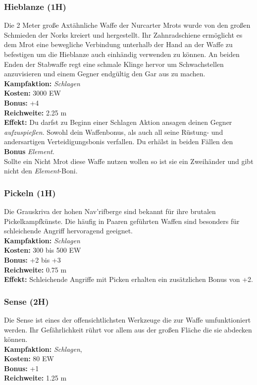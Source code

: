 \subsubsection*{Hieblanze (1H)} \label{ar:hieblanze}
Die 2 Meter große Axtähnliche Waffe der Nurcarter Mrots wurde von den großen Schmieden der Norks kreiert und hergestellt. Ihr Zahnradschiene ermöglicht es dem Mrot eine bewegliche Verbindung unterhalb der Hand an der Waffe zu befestigen um die Hieblanze auch einhändig verwenden zu können. An beiden Enden der Stabwaffe regt eine schmale Klinge hervor um Schwachstellen anzuvisieren und einem Gegner endgültig den Gar aus zu machen. \\
\textbf{Kampfaktion:} \textit{Schlagen}\\
\textbf{Kosten:} 3000 EW\\
\textbf{Bonus:} +4\\
\textbf{Reichweite:} 2.25 m \\
\textbf{Effekt:} Du darfst zu Beginn einer Schlagen Aktion ansagen deinen Gegner \textit{aufzuspießen}. Sowohl dein Waffenbonus, als auch all seine Rüstung- und andersartigen Verteidigungsbonis verfallen. Du erhälst in beiden Fällen den \textbf{Bonus} \textit{Element}.\\
Sollte ein Nicht Mrot diese Waffe nutzen wollen so ist sie ein Zweihänder und gibt nicht den \textit{Element}-Boni.

\subsubsection*{Pickeln (1H)}
Die Grauskriva der hohen Nav'rifberge sind bekannt für ihre brutalen Pickelkampfkünste. Die häufig in Paaren geführten Waffen sind besonders für schleichende Angriff hervoragend geeignet.\\
\textbf{Kampfaktion:} \textit{Schlagen}\\
\textbf{Kosten:} 300 bis 500 EW\\
\textbf{Bonus:} +2 bis +3\\
\textbf{Reichweite:} 0.75 m\\
\textbf{Effekt:} Schleichende Angriffe mit Picken erhalten ein zusätzlichen Bonus von +2.

\subsubsection{Sense (2H)}
Die Sense ist eines der offensichtlichsten Werkzeuge die zur Waffe umfunktioniert werden. Ihr Gefährlichkeit rührt vor allem aus der großen Fläche die sie abdecken können.\\
\textbf{Kampfaktion:} \textit{Schlagen}, \textit{}\\
\textbf{Kosten:} 80 EW\\
\textbf{Bonus:} +1 \\
\textbf{Reichweite:} 1.25 m

